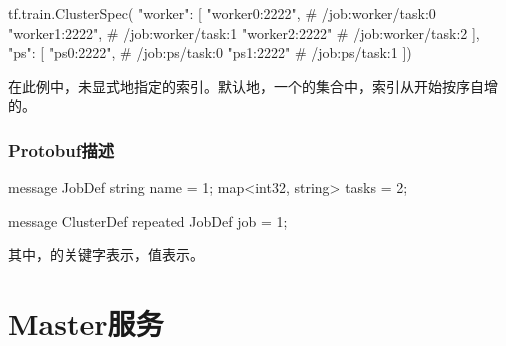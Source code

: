 \begin{content}
\begin{leftbar}
\begin{python}
tf.train.ClusterSpec({
  "worker": [
    "worker0:2222",   # /job:worker/task:0
    "worker1:2222",   # /job:worker/task:1
    "worker2:2222"    # /job:worker/task:2
  ],  
  "ps": [
    "ps0:2222",       # /job:ps/task:0
    "ps1:2222"        # /job:ps/task:1
  ]})
\end{python}
\end{leftbar}

在此例中，未显式地指定的索引。默认地，一个的集合中，索引从开始按序自增的。

\subsubsection{Protobuf描述}

\begin{leftbar}
\begin{python}
message JobDef {
  string name = 1;
  map<int32, string> tasks = 2;
}

message ClusterDef {
  repeated JobDef job = 1;
}
\end{python}
\end{leftbar}

其中，的关键字表示，值表示。

\end{content}

\section{Master服务}

